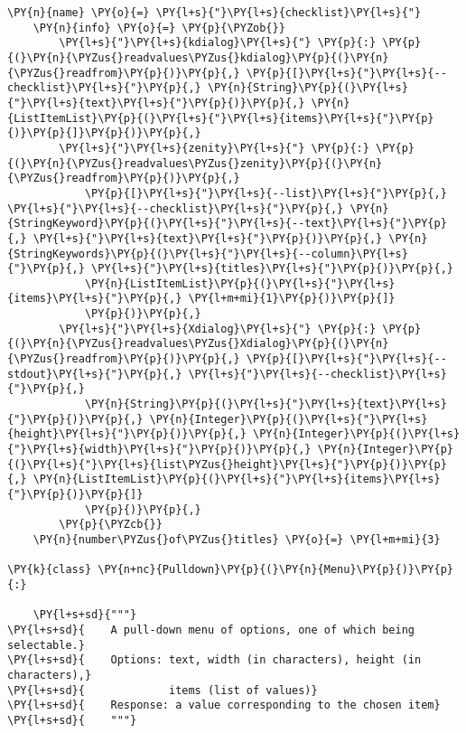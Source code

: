 \begin{Verbatim}[commandchars=\\\{\}]
    \PY{n}{name} \PY{o}{=} \PY{l+s}{"}\PY{l+s}{checklist}\PY{l+s}{"}
    \PY{n}{info} \PY{o}{=} \PY{p}{\PYZob{}}
        \PY{l+s}{"}\PY{l+s}{kdialog}\PY{l+s}{"} \PY{p}{:} \PY{p}{(}\PY{n}{\PYZus{}readvalues\PYZus{}kdialog}\PY{p}{(}\PY{n}{\PYZus{}readfrom}\PY{p}{)}\PY{p}{,} \PY{p}{[}\PY{l+s}{"}\PY{l+s}{--checklist}\PY{l+s}{"}\PY{p}{,} \PY{n}{String}\PY{p}{(}\PY{l+s}{"}\PY{l+s}{text}\PY{l+s}{"}\PY{p}{)}\PY{p}{,} \PY{n}{ListItemList}\PY{p}{(}\PY{l+s}{"}\PY{l+s}{items}\PY{l+s}{"}\PY{p}{)}\PY{p}{]}\PY{p}{)}\PY{p}{,}
        \PY{l+s}{"}\PY{l+s}{zenity}\PY{l+s}{"} \PY{p}{:} \PY{p}{(}\PY{n}{\PYZus{}readvalues\PYZus{}zenity}\PY{p}{(}\PY{n}{\PYZus{}readfrom}\PY{p}{)}\PY{p}{,}
            \PY{p}{[}\PY{l+s}{"}\PY{l+s}{--list}\PY{l+s}{"}\PY{p}{,} \PY{l+s}{"}\PY{l+s}{--checklist}\PY{l+s}{"}\PY{p}{,} \PY{n}{StringKeyword}\PY{p}{(}\PY{l+s}{"}\PY{l+s}{--text}\PY{l+s}{"}\PY{p}{,} \PY{l+s}{"}\PY{l+s}{text}\PY{l+s}{"}\PY{p}{)}\PY{p}{,} \PY{n}{StringKeywords}\PY{p}{(}\PY{l+s}{"}\PY{l+s}{--column}\PY{l+s}{"}\PY{p}{,} \PY{l+s}{"}\PY{l+s}{titles}\PY{l+s}{"}\PY{p}{)}\PY{p}{,}
            \PY{n}{ListItemList}\PY{p}{(}\PY{l+s}{"}\PY{l+s}{items}\PY{l+s}{"}\PY{p}{,} \PY{l+m+mi}{1}\PY{p}{)}\PY{p}{]}
            \PY{p}{)}\PY{p}{,}
        \PY{l+s}{"}\PY{l+s}{Xdialog}\PY{l+s}{"} \PY{p}{:} \PY{p}{(}\PY{n}{\PYZus{}readvalues\PYZus{}Xdialog}\PY{p}{(}\PY{n}{\PYZus{}readfrom}\PY{p}{)}\PY{p}{,} \PY{p}{[}\PY{l+s}{"}\PY{l+s}{--stdout}\PY{l+s}{"}\PY{p}{,} \PY{l+s}{"}\PY{l+s}{--checklist}\PY{l+s}{"}\PY{p}{,}
            \PY{n}{String}\PY{p}{(}\PY{l+s}{"}\PY{l+s}{text}\PY{l+s}{"}\PY{p}{)}\PY{p}{,} \PY{n}{Integer}\PY{p}{(}\PY{l+s}{"}\PY{l+s}{height}\PY{l+s}{"}\PY{p}{)}\PY{p}{,} \PY{n}{Integer}\PY{p}{(}\PY{l+s}{"}\PY{l+s}{width}\PY{l+s}{"}\PY{p}{)}\PY{p}{,} \PY{n}{Integer}\PY{p}{(}\PY{l+s}{"}\PY{l+s}{list\PYZus{}height}\PY{l+s}{"}\PY{p}{)}\PY{p}{,} \PY{n}{ListItemList}\PY{p}{(}\PY{l+s}{"}\PY{l+s}{items}\PY{l+s}{"}\PY{p}{)}\PY{p}{]}
            \PY{p}{)}\PY{p}{,}
        \PY{p}{\PYZcb{}}
    \PY{n}{number\PYZus{}of\PYZus{}titles} \PY{o}{=} \PY{l+m+mi}{3}

\PY{k}{class} \PY{n+nc}{Pulldown}\PY{p}{(}\PY{n}{Menu}\PY{p}{)}\PY{p}{:}

    \PY{l+s+sd}{"""}
\PY{l+s+sd}{    A pull-down menu of options, one of which being selectable.}
\PY{l+s+sd}{    Options: text, width (in characters), height (in characters),}
\PY{l+s+sd}{             items (list of values)}
\PY{l+s+sd}{    Response: a value corresponding to the chosen item}
\PY{l+s+sd}{    """}


\end{Verbatim}

